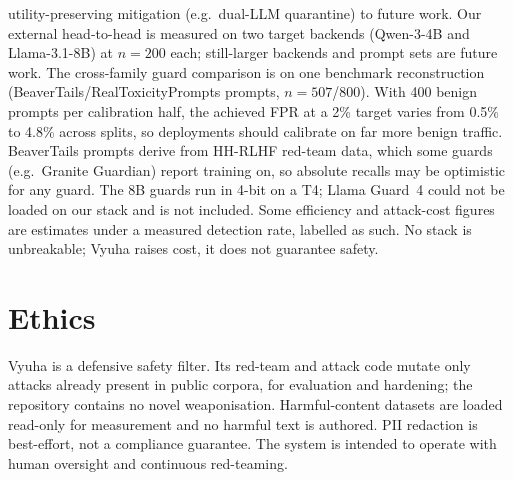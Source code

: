 \documentclass[11pt]{article}
\begin{document}
utility-preserving mitigation (e.g.\ dual-LLM quarantine) to future work. Our external head-to-head is
measured on two target backends (Qwen-3-4B and Llama-3.1-8B) at $n{=}200$ each; still-larger backends
and prompt sets are future work. The cross-family guard comparison is on one benchmark reconstruction (BeaverTails/RealToxicityPrompts
prompts, $n{=}507$/800). With 400 benign prompts per calibration half, the achieved FPR at a 2\% target
varies from 0.5\% to 4.8\% across splits, so deployments should calibrate on far more benign traffic. BeaverTails
prompts derive from HH-RLHF red-team data, which some guards (e.g.\ Granite Guardian) report training on,
so absolute recalls may be optimistic for any guard. The 8B guards run in 4-bit on a T4; Llama Guard~4
could not be loaded on our stack and is not included. Some
efficiency and attack-cost figures are estimates under a measured detection rate, labelled as such. No
stack is unbreakable; Vyuha raises cost, it does not guarantee safety.

\section*{Ethics}
Vyuha is a defensive safety filter. Its red-team and attack code mutate only attacks already present
in public corpora, for evaluation and hardening; the repository contains no novel weaponisation.
Harmful-content datasets are loaded read-only for measurement and no harmful text is authored. PII
redaction is best-effort, not a compliance guarantee. The system is intended to operate with human
oversight and continuous red-teaming.
\end{document}
